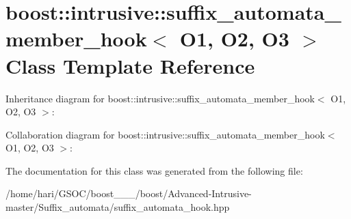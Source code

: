\hypertarget{classboost_1_1intrusive_1_1suffix__automata__member__hook}{}\section{boost\+:\+:intrusive\+:\+:suffix\+\_\+automata\+\_\+member\+\_\+hook$<$ O1, O2, O3 $>$ Class Template Reference}
\label{classboost_1_1intrusive_1_1suffix__automata__member__hook}


Inheritance diagram for boost\+:\+:intrusive\+:\+:suffix\+\_\+automata\+\_\+member\+\_\+hook$<$ O1, O2, O3 $>$\+:


Collaboration diagram for boost\+:\+:intrusive\+:\+:suffix\+\_\+automata\+\_\+member\+\_\+hook$<$ O1, O2, O3 $>$\+:


The documentation for this class was generated from the following file\+:\begin{DoxyCompactItemize}
\item 
/home/hari/\+G\+S\+O\+C/boost\+\_\+\_\+\_/boost/\+Advanced-\/\+Intrusive-\/master/\+Suffix\+\_\+automata/suffix\+\_\+automata\+\_\+hook.\+hpp\end{DoxyCompactItemize}
